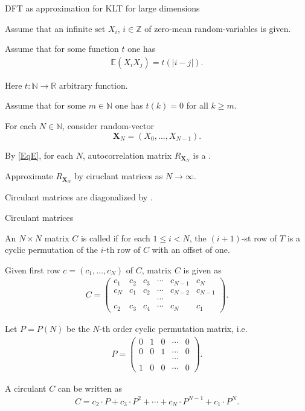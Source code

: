 \begin{frame}{DFT as approximation for KLT for large dimensions}
\bit
\item Assume that an infinite set $X_i$, $i\in\mathbb{Z}$ of zero-mean random-variables is given. 
\item Assume that for some function $t$ one has 
\begin{align}\label{EqE}
\mathbb{E}(X_iX_j)=t(|i-j|).
\end{align}
\item Here $t:\mathbb{N}\to\mathbb{R}$ arbitrary function.
\item Assume that for some $m\in\mathbb{N}$ one has $t(k)=0$ for all $k\geq m$.
\item For each $N\in\mathbb{N}$, consider random-vector
\[
\mathbf{X}_N=(X_0,\dots,X_{N-1}). 
\]
\eit
{}
\bit
\item By \eqref{EqE}, for each $N$, autocorrelation matrix $R_{\mathbf{X}_N}$ is a . 
\item Approximate $R_{\mathbf{X}_N}$ by ciruclant matrices as $N\to\infty$. 
\item Circulant matrices are diagonalized 
by .
\eit
\end{frame}


\begin{frame}{Circulant matrices}
\bit
\item An $N\times N$  matrix $C$ is called  if for each $1\leq i<N$, the $(i+1)$-st row of $T$ is a cyclic permutation of the $i$-th row of $C$ with an offset of one.
\item[\iarrow] Given first row $c=(c_1,\dots,c_N)$ of $C$, matrix $C$ is given as 
\begin{align*}
C=\begin{pmatrix}c_1 & c_2&c_3&\cdots&c_{N-1} & c_N \\ c_N & c_1&c_2&\cdots&c_{N-2} & c_{N-1} \\ 
&&&\cdots&& \\c_2 &c_3&c_4&\cdots&c_N&c_1\end{pmatrix}.
\end{align*} 
\item Let $P=P(N)$  be the $N$-th order cyclic permutation matrix, i.e.  
\begin{align*}
P = \begin{pmatrix}0&1&0&\cdots&0 \\ 0&0&1&\cdots&0 \\ &&&\cdots &\\  1 & 0&0&\cdots &0\end{pmatrix} .
\end{align*}
\item A circulant $C$ can be written as 
\begin{align}\label{EqCirc}
C=c_2\cdot P+c_3\cdot P^2+\cdots+c_N\cdot P^{N-1}+c_1\cdot P^N.
\end{align}
\eit 
\end{frame}

